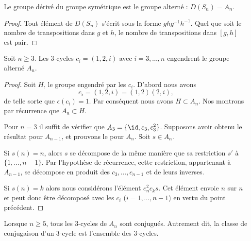\begin{lemma}   \label{LemiApyfp}
    Le groupe dérivé du groupe symétrique est le groupe alterné : \( D(S_n)=A_n\).
\end{lemma}

\begin{proof}
    Tout élément de \( D(S_n)\) s'écrit sous la forme \( ghg^{-1}h^{-1}\). Quel que soit le nombre de transpositions dans \( g\) et \( h\), le nombre de transpositions dans \( [g,h]\) est pair.
\end{proof}

\begin{proposition}     \label{PropsHlmvv}
    Soit \( n\geq 3\). Les \( 3\)-cycles \( c_i=(1,2,i)\) avec \( i=3,\ldots, n\) engendrent le groupe alterné \( A_n\).
\end{proposition}

\begin{proof}
    Soit \( H\), le groupe engendré par les \( c_i\). D'abord nous avons 
    \begin{equation}
        c_i=(1,2,i)=(1,2)(2,i),
    \end{equation}
    de telle sorte que \( \epsilon(c_i)=1\). Par conséquent nous avons \( H\subset A_n\). Nos montrons par récurrence que \( A_n\subset H\).

    Pour \( n=3\) il suffit de vérifier que \( A_3=\{ \id,c_3,c_3^2 \}\). Supposons avoir obtenu le résultat pour \(A_{n-1}\), et prouvons le pour \( A_n\). Soit \( s\in A_n\).

    Si \( s(n)=n\), alors \( s\) se décompose de la même manière que sa restriction \( s'\) à \( \{ 1,\ldots, n-1 \}\). Par l'hypothèse de récurrence, cette restriction, appartenant à \( A_{n-1}\),  se décompose en produit des \( c_3,\ldots, c_{n-1}\) et de leurs inverses.

    Si \( s(n)=k\) alors nous considérons l'élément \( c^2_nc_ks\). Cet élément envoie \( n\) sur \( n\) et peut donc être décomposé avec les \( c_i\) (\( i=1,\ldots, n-1\)) en vertu du point précédent.
\end{proof}

\begin{proposition} \label{PropiodtBG}
    Lorsque \( n\geq 5\), tous les \( 3\)-cycles de \( A_n\) sont conjugués. Autrement dit, la classe de conjugaison d'un \( 3\)-cycle est l'ensemble des \( 3\)-cycles.
\end{proposition}


